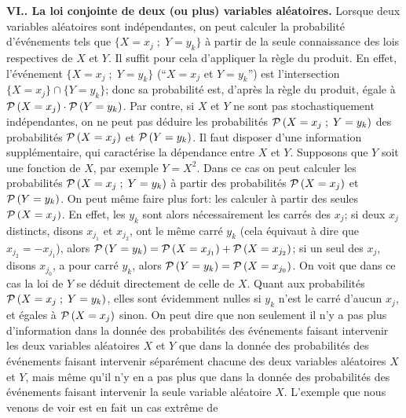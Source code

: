 \bigskip

{\bf VI..  La loi conjointe de deux (ou plus) variables
al\'eatoires.} 
\medskip
Lorsque deux variables al\'eatoires sont ind\'ependantes, on peut calculer 
la probabilit\'e d'\'ev\'enements tels que $\{ X = x_j \; ;\; Y = y_k \}$ \`a
partir de la seule connaissance des lois respectives de $X$ et $Y$. Il suffit
pour cela d'appliquer la r\`egle du produit. En effet, l'\'ev\'enement $\{ X =
x_j \; ;\;  Y = y_k \}$ (``$X = x_j$ et $Y = y_k$'') est l'intersection $\{ X =
x_j \} \cap \{ Y = y_k \}$; donc sa probabilit\'e est, d'apr\`es la r\`egle du
produit, \'egale \`a  ${\cal P}\, ( X = x_j ) \cdot {\cal P}\, ( Y = y_k )$.
\medskip
Par contre, si $X$ et $Y$ ne sont pas stochastiquement ind\'ependantes, on
ne peut pas d\'eduire les probabilit\'es ${\cal P}\, (  X = x_j \; ;\; Y = y_k 
)$
des probabilit\'es ${\cal P}\, (  X = x_j )$ et ${\cal P}\, ( Y = y_k )$. Il 
faut
disposer d'une information suppl\'ementaire, qui caract\'erise la 
d\'ependance  entre $X$ et $Y$. 
\medskip
Supposons que $Y$ soit une fonction de $X$, par exemple $Y = X^2$. Dans 
ce cas on peut calculer les probabilit\'es ${\cal P}\, ( X = x_j \; ;\; Y = 
y_k )$ \`a partir des probabilit\'es ${\cal P}\, (  X = x_j )$ et  ${\cal P}\,  
( Y = y_k )$.  
\medskip
On peut m\^eme faire plus fort: les calculer \`a partir des seules ${\cal P}
\, (  X = x_j )$. En effet, les $y_k$ sont alors n\'ecessairement les carr\'es
des $x_j$; si deux $x_j$ distincts, disons $x_{j_1}$ et $x_{j_2}$, ont le
m\^eme carr\'e $y_k$ (cela \'equivaut \`a dire que $x_{j_2} = -x_{j_1}$),
alors ${\cal P}\, (Y = y_k) = {\cal P}\, (X = x_{j_1}) + {\cal P}\, (X =
x_{j_2})$; si un seul des $x_j$, disons $x_{j_0}$, a pour carr\'e $y_k$,
alors ${\cal P}\, (Y = y_k) = {\cal P}\, (X = x_{j_0})$. On voit que dans ce
cas la loi de $Y$ se d\'eduit directement de celle de $X$. Quant aux
probabilit\'es ${\cal P}\, (  X = x_j \; ; \; Y = y_k )$, elles sont
\'evidemment nulles si $y_k$ n'est le carr\'e d'aucun $x_j$, et \'egales \`a
${\cal P}\, ( X = x_j )$ sinon. On peut dire  que non seulement il n'y a pas 
plus d'information dans la donn\'ee des probabilit\'es des \'ev\'enements
faisant intervenir les deux variables al\'eatoires $X$ et $Y$ que dans la
donn\'ee des probabilit\'es des \'ev\'enements  faisant intervenir
s\'epar\'ement chacune des deux variables al\'eatoires $X$ et $Y$, mais
m\^eme qu'il n'y en a pas plus que dans la donn\'ee des probabilit\'es des
\'ev\'enements  faisant intervenir  la seule variable al\'eatoire $X$.  
\medskip
L'exemple que nous venons de voir est en fait un cas extr\^eme de
